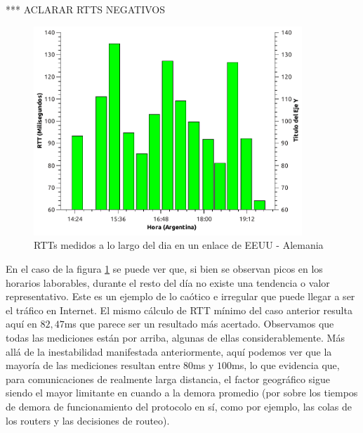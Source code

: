 
*** ACLARAR RTTS NEGATIVOS


\begin{figure}[H]
  \centering
    \includegraphics[width=0.9\textwidth]{graficos/rtts_dia_inglaterra.pdf}
    \caption{RTTs medidos a lo largo del dia en un enlace de EEUU - Alemania}
    \label{fig:rtts_ing}
\end{figure}

En el caso de la figura \ref{fig:rtts_ing} se puede ver que, si bien se observan picos en los horarios laborables, durante el resto del día no existe una tendencia o valor representativo. Este es un ejemplo de lo caótico e irregular que puede llegar a ser el tráfico en Internet. El mismo cálculo de RTT mínimo del caso anterior resulta aquí en $82,47$ms que parece ser un resultado más acertado. Observamos que todas las mediciones están por arriba, algunas de ellas considerablemente. Más allá de la inestabilidad manifestada anteriormente, aquí podemos ver que la mayoría de las mediciones resultan entre $80$ms y $100$ms, lo que evidencia que, para comunicaciones de realmente larga distancia, el factor geográfico sigue siendo el mayor limitante en cuando a la demora promedio (por sobre los tiempos de demora de funcionamiento del protocolo en sí, como por ejemplo, las colas de los routers y las decisiones de routeo).